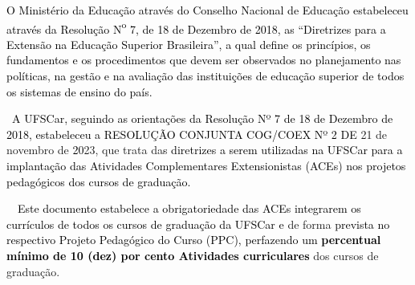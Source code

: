 




%
 




\bigskip

\textcolor{black}{O Ministério da Educação através do Conselho Nacional de Educação estabeleceu através da Resolução
N}\textcolor{black}{\textsuperscript{o}}\textcolor{black}{ 7, de 18 de Dezembro de 2018, as “Diretrizes para a Extensão
na Educação Superior Brasileira”, a qual define os princípios, os fundamentos e os procedimentos que devem ser
observados no planejamento nas políticas, na gestão e na avaliação das instituições de educação superior de todos os
sistemas de ensino do país.}


\textcolor{black}{\ A UFSCar, seguindo as orientações da Resolução Nº 7 de 18 de Dezembro de 2018, estabeleceu a
RESOLUÇÃO CONJUNTA COG/COEX Nº 2 DE }21 de novembro de \textcolor{black} { 20}23, que trata da\textcolor{black}{s
diretrizes a serem utilizadas na UFSCar para a implantação das Atividades Complementares Extensionistas (ACEs)}
\textcolor{black}{nos projetos pedagógicos dos cursos de graduação.}

\textcolor{black}{\ \ Este documento estabelece a obrigatoriedade das ACEs integrarem os currículos de todos os cursos
de graduação da UFSCar e }de  forma \textcolor{black} { prevista no respectivo Projeto Pedagógico do Curso (PPC),
perfazendo um }\textbf{\textcolor{black}{percentual mínimo de 10 (dez) por cento Atividades curriculares}} dos cursos de
graduação.\textcolor{black}{ }


